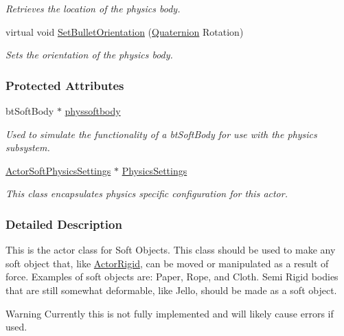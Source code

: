 \begin{DoxyCompactItemize}
\begin{DoxyCompactList}\small\item\em Retrieves the location of the physics body. \item\end{DoxyCompactList}\item 
virtual void \hyperlink{classphys_1_1ActorSoft_a4a1119b6e42ff11784673657e7d62c1f}{SetBulletOrientation} (\hyperlink{classphys_1_1Quaternion}{Quaternion} Rotation)
\begin{DoxyCompactList}\small\item\em Sets the orientation of the physics body. \item\end{DoxyCompactList}\end{DoxyCompactItemize}
\subsubsection*{Protected Attributes}
\begin{DoxyCompactItemize}
\item 
\hypertarget{classphys_1_1ActorSoft_ab3b2c8e1f94dff3e3244a5024595afef}{
btSoftBody $\ast$ \hyperlink{classphys_1_1ActorSoft_ab3b2c8e1f94dff3e3244a5024595afef}{physsoftbody}}
\label{d4/d23/classphys_1_1ActorSoft_ab3b2c8e1f94dff3e3244a5024595afef}

\begin{DoxyCompactList}\small\item\em Used to simulate the functionality of a btSoftBody for use with the physics subsystem. \item\end{DoxyCompactList}\item 
\hypertarget{classphys_1_1ActorSoft_a66c879cdae4ca6a90cb696083513c115}{
\hyperlink{classphys_1_1ActorSoftPhysicsSettings}{ActorSoftPhysicsSettings} $\ast$ \hyperlink{classphys_1_1ActorSoft_a66c879cdae4ca6a90cb696083513c115}{PhysicsSettings}}
\label{d4/d23/classphys_1_1ActorSoft_a66c879cdae4ca6a90cb696083513c115}

\begin{DoxyCompactList}\small\item\em This class encapsulates physics specific configuration for this actor. \item\end{DoxyCompactList}\end{DoxyCompactItemize}


\subsubsection{Detailed Description}
This is the actor class for Soft Objects. This class should be used to make any soft object that, like \hyperlink{classphys_1_1ActorRigid}{ActorRigid}, can be moved or manipulated as a result of force. Examples of soft objects are: Paper, Rope, and Cloth. Semi Rigid bodies that are still somewhat deformable, like Jello, should be made as a soft object. \begin{DoxyWarning}{Warning}
Currently this is not fully implemented and will likely cause errors if used. 
\end{DoxyWarning}


